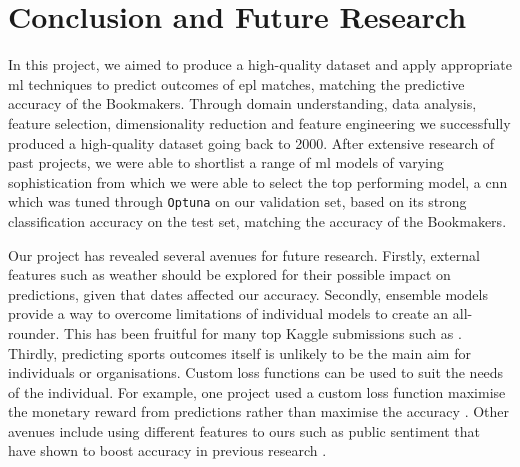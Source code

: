 \documentclass{article}
\newcommand{\sw}[1]{\texttt{#1}}
\begin{document}
\section{Conclusion and Future Research}
\label{conclusions}

In this project, we aimed to produce a high-quality dataset and apply appropriate \gls{ml} techniques to predict outcomes of \gls{epl} matches, matching the predictive accuracy of the Bookmakers. Through domain understanding, data analysis, feature selection, dimensionality reduction and feature engineering we successfully produced a high-quality dataset going back to 2000. After extensive research of past projects, we were able to shortlist a range of \gls{ml} models of varying sophistication from which we were able to select the top performing model, a \gls{cnn} which was tuned through \sw{Optuna} on our validation set, based on its strong classification accuracy on the test set, matching the accuracy of the Bookmakers.  

Our project has revealed several avenues for future research. Firstly, external features such as weather should be explored for their possible impact on predictions, given that dates affected our accuracy. Secondly, ensemble models provide a way to overcome limitations of individual models to create an all-rounder. This has been fruitful for many top Kaggle submissions such as \cite{lumedium35}. Thirdly, predicting sports outcomes itself is unlikely to be the main aim for individuals or organisations. Custom loss functions can be used to suit the needs of the individual. For example, one project used a custom loss function maximise the monetary reward from predictions rather than maximise the accuracy \cite{malafossemediumnotclassification}. Other avenues include using different features to ours such as public sentiment that have shown to boost accuracy in previous research \cite{balawejdermediumpredictions}.


{\footnotesize
}
\end{document}
